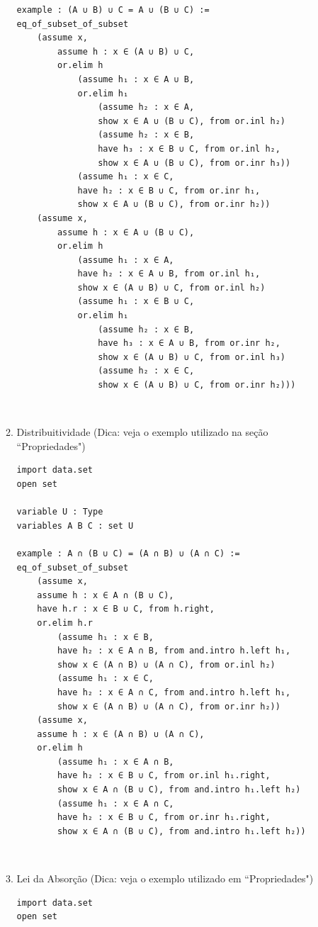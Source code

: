 \begin{enumerate}
\begin{enumerate}
\begin{lstlisting}
example : (A ∪ B) ∪ C = A ∪ (B ∪ C) :=
eq_of_subset_of_subset
    (assume x,
        assume h : x ∈ (A ∪ B) ∪ C,
        or.elim h
            (assume h₁ : x ∈ A ∪ B,
            or.elim h₁
                (assume h₂ : x ∈ A,
                show x ∈ A ∪ (B ∪ C), from or.inl h₂)
                (assume h₂ : x ∈ B,
                have h₃ : x ∈ B ∪ C, from or.inl h₂,
                show x ∈ A ∪ (B ∪ C), from or.inr h₃))
            (assume h₁ : x ∈ C,
            have h₂ : x ∈ B ∪ C, from or.inr h₁,
            show x ∈ A ∪ (B ∪ C), from or.inr h₂))
    (assume x,
        assume h : x ∈ A ∪ (B ∪ C),
        or.elim h
            (assume h₁ : x ∈ A,
            have h₂ : x ∈ A ∪ B, from or.inl h₁,
            show x ∈ (A ∪ B) ∪ C, from or.inl h₂)
            (assume h₁ : x ∈ B ∪ C,
            or.elim h₁
                (assume h₂ : x ∈ B,
                have h₃ : x ∈ A ∪ B, from or.inr h₂,
                show x ∈ (A ∪ B) ∪ C, from or.inl h₃)
                (assume h₂ : x ∈ C,
                show x ∈ (A ∪ B) ∪ C, from or.inr h₂))) \end{lstlisting}

$\qquad$
\item Distribuitividade (Dica: veja o exemplo utilizado na seção ``Propriedades")
\begin{lstlisting}
import data.set
open set

variable U : Type
variables A B C : set U

example : A ∩ (B ∪ C) = (A ∩ B) ∪ (A ∩ C) :=
eq_of_subset_of_subset
    (assume x,
    assume h : x ∈ A ∩ (B ∪ C),
    have h.r : x ∈ B ∪ C, from h.right,
    or.elim h.r
        (assume h₁ : x ∈ B,
        have h₂ : x ∈ A ∩ B, from and.intro h.left h₁,
        show x ∈ (A ∩ B) ∪ (A ∩ C), from or.inl h₂)
        (assume h₁ : x ∈ C,
        have h₂ : x ∈ A ∩ C, from and.intro h.left h₁,
        show x ∈ (A ∩ B) ∪ (A ∩ C), from or.inr h₂))
    (assume x,
    assume h : x ∈ (A ∩ B) ∪ (A ∩ C),
    or.elim h
        (assume h₁ : x ∈ A ∩ B,
        have h₂ : x ∈ B ∪ C, from or.inl h₁.right,
        show x ∈ A ∩ (B ∪ C), from and.intro h₁.left h₂)
        (assume h₁ : x ∈ A ∩ C,
        have h₂ : x ∈ B ∪ C, from or.inr h₁.right,
        show x ∈ A ∩ (B ∪ C), from and.intro h₁.left h₂)) \end{lstlisting}

$\qquad$
\item Lei da Absorção (Dica: veja o exemplo utilizado em ``Propriedades")
\begin{lstlisting}
import data.set
open set


\end{lstlisting}
\end{enumerate}
\end{enumerate}
